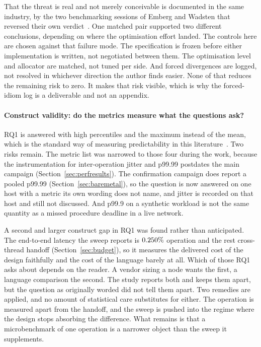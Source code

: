 \documentclass[english,oneside,a4paper,censored,csm,software-track-2020]{HYthesisML}
\begin{document}
That the threat is real and not merely conceivable is documented in the same industry, by the two
benchmarking sessions of Emberg and Wadsten that reversed their own
verdict~\cite{emberg2023asn1}. One matched pair supported two different conclusions, depending on
where the optimisation effort landed. The controls here are chosen against that failure
mode. The specification is frozen before either implementation is written, not negotiated
between them. The optimisation level and allocator are matched, not tuned per side. And
forced divergences are logged, not resolved in whichever direction the author finds easier.
None of that reduces the remaining risk to zero. It makes that risk visible, which is why the
forced-idiom log is a deliverable and not an appendix.

\paragraph{Construct validity: do the metrics measure what the questions ask?}
RQ1 is answered with high percentiles and the maximum instead of the mean, which is the standard
way of measuring predictability in this literature~\cite{dean2013tail}. Two risks remain. The
metric list was narrowed to those four during the work, because the instrumentation for
inter-operation jitter and p99.99 postdates the main campaign
(Section~\ref{sec:perfresults}). The confirmation campaign does report a pooled p99.99
(Section~\ref{sec:baremetal}), so the question is now answered on one host with a metric its own
wording does not name, and jitter is recorded on that host and still not discussed. And p99.9 on
a synthetic workload is not the same quantity as a missed procedure deadline in a live network.

A second and larger construct gap in RQ1 was found rather than anticipated. The end-to-end latency
the sweep reports is $0.250\%$ operation and the rest cross-thread handoff
(Section~\ref{sec:budget}), so it measures the delivered cost of the design faithfully and the
cost of the language barely at all. Which of those RQ1 asks about depends on the reader. A vendor
sizing a node wants the first, a language comparison the second. The study reports both and keeps
them apart, but the question as originally worded did not tell them apart. Two remedies are
applied, and no amount of statistical care substitutes for either. The operation is measured apart
from the handoff, and the sweep is pushed into the regime where the design stops absorbing the
difference. What remains is that a microbenchmark of one operation is a narrower object than the
sweep it supplements.
\end{document}
